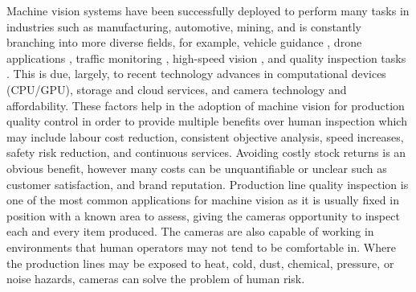 \documentclass[fleqn,twoside]{article}
\begin{document}
Machine vision systems have been successfully deployed to perform many tasks in industries such as manufacturing, automotive, mining, and is constantly branching into more diverse fields, for example, vehicle guidance \cite{menze,urmson}, drone applications \cite{greene,boucher}, traffic monitoring \cite{cheung,kamijo}, high-speed vision \cite{watanabe,nakabo}, and quality inspection tasks \cite{cubero, du}. This is due, largely, to recent technology advances in computational devices (CPU/GPU), storage and cloud services, and camera technology and affordability. These factors help in the adoption of machine vision for production quality control in order to provide multiple benefits over human inspection which may include labour cost reduction, consistent objective analysis, speed increases, safety risk reduction, and continuous services. Avoiding costly stock returns is an obvious benefit, however many costs can be unquantifiable or unclear such as customer satisfaction, and brand reputation. Production line quality inspection is one of the most common applications for machine vision as it is usually fixed in position with a known area to assess, giving the cameras opportunity to inspect each and every item produced. The cameras are also capable of working in environments that human operators may not tend to be comfortable in. Where the production lines may be exposed to heat, cold, dust, chemical, pressure, or noise hazards, cameras can solve the problem of human risk. 
\end{document}
